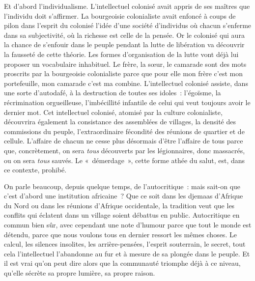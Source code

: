\documentclass[french,twoside]{book} %
\begin{document}
Et d’abord l’individualisme. L’intellectuel colonisé avait appris de ses maîtres que l’individu doit s’affirmer. La bourgeoisie colonialiste avait enfoncé à coups de pilon dans l’esprit du colonisé l’idée d’une société d’individus où chacun s’enferme dans sa subjectivité, où la richesse est celle de la pensée. Or le colonisé qui aura la chance de s’enfouir dans le peuple pendant la lutte de libération va découvrir la fausseté de cette théorie. Les formes d’organisation de la lutte vont déjà lui proposer un vocabulaire inhabituel. Le frère, la sœur, le camarade sont des mots proscrits par la bourgeoisie colonialiste parce que pour elle mon frère c’est mon portefeuille, mon camarade c’est ma combine. L’intellectuel colonisé assiste, dans une sorte d’autodafé, à la destruction de toutes ses idoles : l’égoïsme, la récrimination orgueilleuse, l’imbécillité infantile de celui qui veut toujours avoir le dernier mot. Cet intellectuel colonisé, atomisé   par la culture colonialiste, découvrira également la consistance des assemblées de villages, la densité des commissions du peuple, l’extraordinaire fécondité des réunions de quartier et de cellule. L’affaire de chacun ne cesse plus désormais d’être l’affaire de tous parce que, concrètement, on sera \emph{tous} découverts par les légionnaires, donc massacrés, ou on sera \emph{tous} sauvés. Le « démerdage », cette forme athée du salut, est, dans ce contexte, prohibé.\par
On parle beaucoup, depuis quelque temps, de l’autocritique : mais sait-on que c’est d’abord une institution africaine ? Que ce soit dans les djemaas d’Afrique du Nord ou dans les réunions d’Afrique occidentale, la tradition veut que les conflits qui éclatent dans un village soient débattus en public. Autocritique en commun bien sûr, avec cependant une note d’humour parce que tout le monde est détendu, parce que nous voulons tous en dernier ressort les mêmes choses. Le calcul, les silences insolites, les arrière-pensées, l’esprit souterrain, le secret, tout cela l’intellectuel l’abandonne au fur et à mesure de sa plongée dans le peuple. Et il est vrai qu’on peut dire alors que la communauté triomphe déjà à ce niveau, qu’elle sécrète sa propre lumière, sa propre raison.\par
\end{document}
